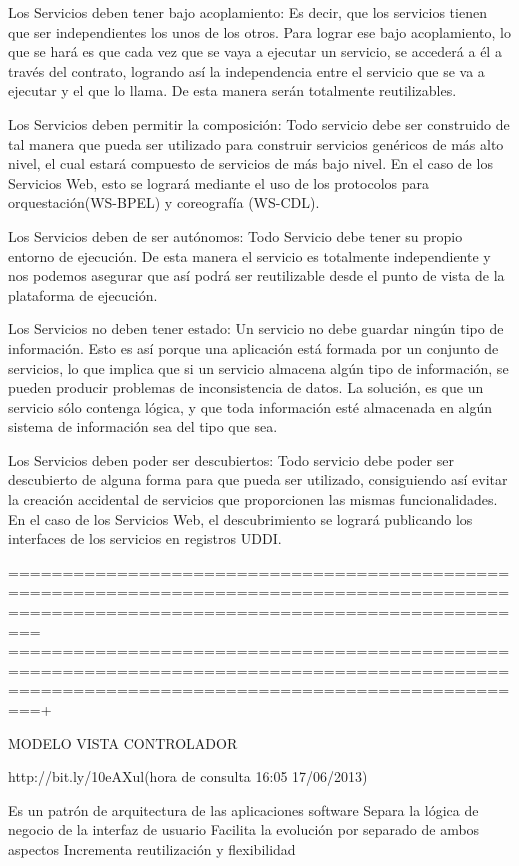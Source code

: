     Los Servicios deben tener bajo acoplamiento: Es decir, que los servicios tienen que ser independientes los unos de los otros. Para 
    lograr ese bajo acoplamiento, lo que se hará es que cada vez que se vaya a ejecutar un servicio, se accederá a él a través del contrato, 
    logrando así la independencia entre el servicio que se va a ejecutar y el que lo llama. De esta manera serán totalmente reutilizables.

    Los Servicios deben permitir la composición: Todo servicio debe ser construido de tal manera que pueda ser utilizado para construir 
    servicios genéricos de más alto nivel, el cual estará compuesto de servicios de más bajo nivel. En el caso de los Servicios Web, esto 
    se logrará mediante el uso de los protocolos para orquestación(WS-BPEL) y coreografía (WS-CDL).

    Los Servicios deben de ser autónomos: Todo Servicio debe tener su propio entorno de ejecución. De esta manera el servicio es totalmente 
    independiente y nos podemos asegurar que así podrá ser reutilizable desde el punto de vista de la plataforma de ejecución.

    Los Servicios no deben tener estado: Un servicio no debe guardar ningún tipo de información. Esto es así porque una aplicación está 
    formada por un conjunto de servicios, lo que implica que si un servicio almacena algún tipo de información, se pueden producir 
    problemas de inconsistencia de datos. La solución, es que un servicio sólo contenga lógica, y que toda información esté almacenada 
    en algún sistema de información sea del tipo que sea.

    Los Servicios deben poder ser descubiertos: Todo servicio debe poder ser descubierto de alguna forma para que pueda ser utilizado, 
    consiguiendo así evitar la creación accidental de servicios que proporcionen las mismas funcionalidades. En el caso de los Servicios 
    Web, el descubrimiento se logrará publicando los interfaces de los servicios en registros UDDI.
    
=============================================================================================================================================
=============================================================================================================================================+

MODELO VISTA CONTROLADOR

http://bit.ly/10eAXul(hora de consulta 16:05 17/06/2013)

Es un patrón de arquitectura de las aplicaciones software
Separa la lógica de negocio de la interfaz de usuario
Facilita la evolución por separado de ambos aspectos
Incrementa reutilización y flexibilidad

